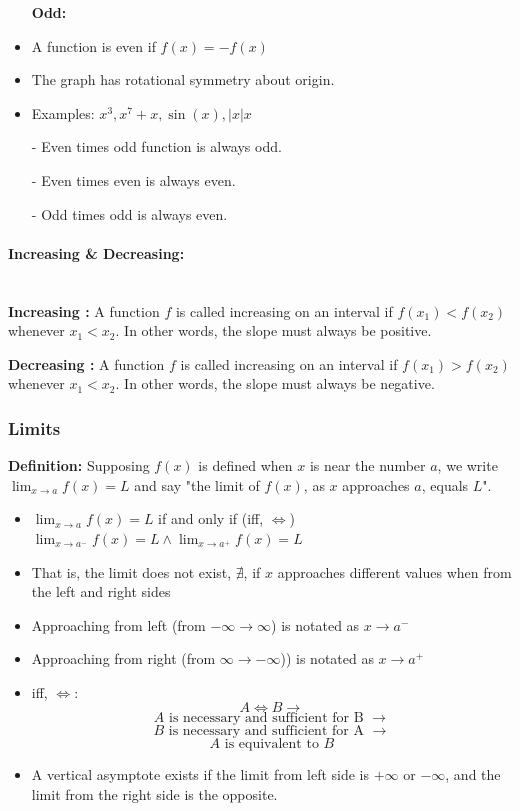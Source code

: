 \documentclass[12pt]{article}
\newcommand{\paragraphNewLine}[1]{\paragraph{#1}\mbox{}\\}
\begin{document}
\begin{itemize}
    \item[] \textbf{Odd: }
    \item A function is even if $f(x) = -f(x)$
    \item The graph has rotational symmetry about origin.
    \item Examples: $x^3, x^{7}+x, \sin(x), |x|x$
\end{itemize}

\noindent\hrulefill

\begin{itemize}
    \item[-] Even times odd function is always odd.
    \item[-] Even times even is always even.
    \item[-] Odd times odd is always even.
\end{itemize}

\paragraphNewLine{Increasing \& Decreasing:}

\textbf{Increasing : } A  function $f$ is called increasing on an interval if $f(x_1) < f(x_2)$ whenever $x_1 < x_2$. In other words, the slope must always be positive.

\textbf{Decreasing : } A  function $f$ is called increasing on an interval if $f(x_1) > f(x_2)$ whenever $x_1 < x_2$. In other words, the slope must always be negative.


\subsubsection{Limits}

\textbf{Definition: } Supposing $f(x)$ is defined when $x$ is near the number $a$, we write $\lim_{x\to a} f(x) = L$ and say "the limit of $f(x)$, as $x$ approaches $a$, equals $L$".


\begin{itemize}
    \item $\lim_{x\to a} f(x) = L$ if and only if (iff, $\iff$) $\lim_{x\to a^-} f(x) = L \wedge \lim_{x\to a^+} f(x) = L$
    \item That is, the limit does not exist, $\nexists$, if $x$ approaches different values when from the left and right sides 
    \item Approaching from left (from $-\infty \to \infty$) is notated as $x \to a^-$
    \item Approaching from right (from $\infty \to -\infty$)) is notated as $x \to a^+$
    \item iff, $\iff$:
        $$A \iff B \rightarrow{}$$
        $$A \text{ is necessary and sufficient for B }\rightarrow{}$$
        $$B \text{ is necessary and sufficient for A } \rightarrow{}$$
        $$A \text{ is equivalent to } B$$
    \item A vertical asymptote exists if the limit from left side is $+\infty$ or $-\infty$, and the limit from the right side is the opposite.
\end{itemize}
\end{document}
